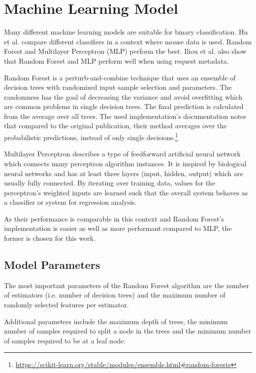 \documentclass[
    fontsize=12pt,
    headings=small,
    parskip=half,           %
    bibliography=totoc,
    numbers=noenddot,       %
    open=any,               %
    final                   %
]{scrreprt}
\begin{document}
\section{Machine Learning Model}

Many different machine learning models are suitable for binary classification. Hu et al. \cite{8275816} compare different classifiers in a context where mouse data is used. Random Forest and Multilayer Perceptron (MLP) perform the best.
Iliou et al. \cite{10.1145/3339252.3339267} also show that Random Forest and MLP perform well when using request metadata.

Random Forest\cite{Breiman2001} is a perturb-and-combine technique that uses an ensemble of decision trees with randomized input sample selection and parameters. The randomness has the goal of decreasing the variance and avoid overfitting which are common problems in single decision trees. The final prediction is calculated from the average over all trees. The used implementation's documentation notes that compared to the original publication, their method averages over the probabilistic predictions, instead of only single decisions.\footnote{\url{https://scikit-learn.org/stable/modules/ensemble.html\#random-forests}}

Multilayer Perceptron describes a type of feedforward artificial neural network which connects many perceptron algorithm instances. It is inspired by biological neural networks and has at least three layers (input, hidden, output) which are usually fully connected. By iterating over training data, values for the perceptron's weighted inputs are learned such that the overall system behaves as a classifier or system for regression analysis.

As their performance is comparable in this context and Random Forest's implementation is easier as well as more performant compared to MLP, the former is chosen for this work.

\subsection{Model Parameters}

The most important parameters of the Random Forest algorithm are the number of estimators (i.e. number of decision trees) and the maximum number of randomly selected features per estimator.

Additional parameters include the maximum depth of trees, the minimum number of samples required to split a node in the trees and the minimum number of samples required to be at a leaf node.
\end{document}
